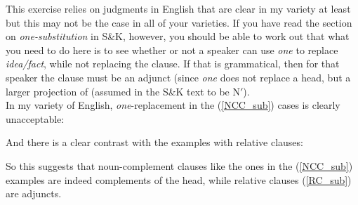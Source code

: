 \documentclass{article}
\begin{document}
\begin{answer}
{This exercise relies on judgments in English that are clear in my variety at least but this may not be the case in all of your varieties.
If you have read the section on \emph{one-substitution} in S\&K, however, you should be able to work out that what you need to do here is to see whether or not a speaker can use \emph{one} to replace \emph{idea/fact}, while not replacing the clause.
If that is grammatical, then for that speaker the clause must be an adjunct (since \emph{one} does not replace a head, but a larger projection of  (assumed in the S\&K text to be N$'$).\\
In my variety of English, \emph{one}-replacement in the (\ref{NCC_sub}) cases is clearly unacceptable:
\begin{exe}
    \label{NCC_sub}
\end{exe}
And there is a clear contrast with the examples with relative clauses:
\begin{exe}
    \label{RC_sub}
\end{exe}
So this suggests that noun-complement clauses like the ones in the (\ref{NCC_sub}) examples are indeed complements of the head, while relative clauses (\ref{RC_sub}) are adjuncts.
}
\end{answer}
\end{document}
